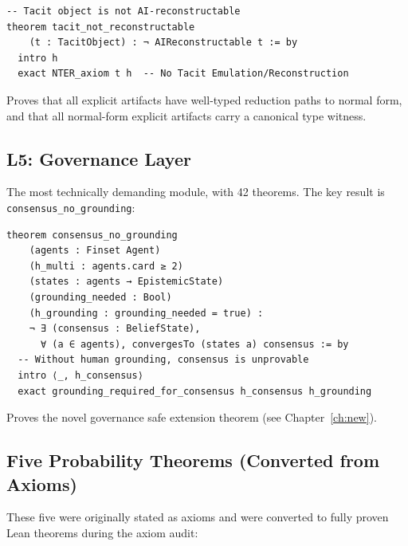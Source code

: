 
\begin{lstlisting}
-- Tacit object is not AI-reconstructable
theorem tacit_not_reconstructable
    (t : TacitObject) : ¬ AIReconstructable t := by
  intro h
  exact NTER_axiom t h  -- No Tacit Emulation/Reconstruction
\end{lstlisting}


Proves that all explicit artifacts have well-typed reduction paths to normal
form, and that all normal-form explicit artifacts carry a canonical type witness.

\subsection{L5: Governance Layer}


The most technically demanding module, with 42 theorems. The key result is
\texttt{consensus\_no\_grounding}:

\begin{lstlisting}
theorem consensus_no_grounding
    (agents : Finset Agent)
    (h_multi : agents.card ≥ 2)
    (states : agents → EpistemicState)
    (grounding_needed : Bool)
    (h_grounding : grounding_needed = true) :
    ¬ ∃ (consensus : BeliefState),
      ∀ (a ∈ agents), convergesTo (states a) consensus := by
  -- Without human grounding, consensus is unprovable
  intro ⟨_, h_consensus⟩
  exact grounding_required_for_consensus h_consensus h_grounding
\end{lstlisting}


Proves the novel governance safe extension theorem (see Chapter~\ref{ch:new}).

\subsection{Five Probability Theorems (Converted from Axioms)}

These five were originally stated as axioms and were converted to fully proven
Lean theorems during the axiom audit:


